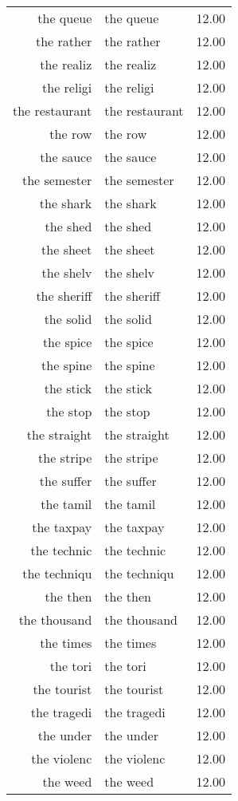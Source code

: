 \begin{table}[ht]
\begin{tabular}{rlr}
  the queue & the queue & 12.00 \\ 
  the rather & the rather & 12.00 \\ 
  the realiz & the realiz & 12.00 \\ 
  the religi & the religi & 12.00 \\ 
  the restaurant & the restaurant & 12.00 \\ 
  the row & the row & 12.00 \\ 
  the sauce & the sauce & 12.00 \\ 
  the semester & the semester & 12.00 \\ 
  the shark & the shark & 12.00 \\ 
  the shed & the shed & 12.00 \\ 
  the sheet & the sheet & 12.00 \\ 
  the shelv & the shelv & 12.00 \\ 
  the sheriff & the sheriff & 12.00 \\ 
  the solid & the solid & 12.00 \\ 
  the spice & the spice & 12.00 \\ 
  the spine & the spine & 12.00 \\ 
  the stick & the stick & 12.00 \\ 
  the stop & the stop & 12.00 \\ 
  the straight & the straight & 12.00 \\ 
  the stripe & the stripe & 12.00 \\ 
  the suffer & the suffer & 12.00 \\ 
  the tamil & the tamil & 12.00 \\ 
  the taxpay & the taxpay & 12.00 \\ 
  the technic & the technic & 12.00 \\ 
  the techniqu & the techniqu & 12.00 \\ 
  the then & the then & 12.00 \\ 
  the thousand & the thousand & 12.00 \\ 
  the times & the times & 12.00 \\ 
  the tori & the tori & 12.00 \\ 
  the tourist & the tourist & 12.00 \\ 
  the tragedi & the tragedi & 12.00 \\ 
  the under & the under & 12.00 \\ 
  the violenc & the violenc & 12.00 \\ 
  the weed & the weed & 12.00 \\ 

\end{tabular}
\end{table}
